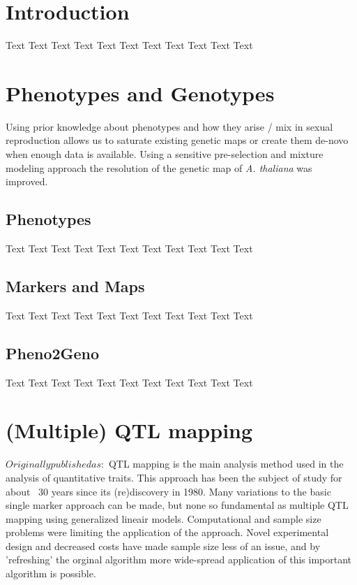 \documentclass[11pt, twoside, a5paper]{report}
\begin{document}
\tableofcontents

\chapter{Introduction}
Text Text Text Text Text Text Text Text Text Text Text

\chapter{Phenotypes and Genotypes}
Using prior knowledge about phenotypes and how they arise / mix in sexual reproduction allows us to saturate 
existing genetic maps or create them de-novo when enough data is available. Using a sensitive pre-selection 
and mixture modeling approach the resolution of the genetic map of \emph{A. thaliana} was improved.

\section{Phenotypes}
Text Text Text Text Text Text Text Text Text Text Text

\section{Markers and Maps}
Text Text Text Text Text Text Text Text Text Text Text

\section{Pheno2Geno}
Text Text Text Text Text Text Text Text Text Text Text

\chapter{(Multiple) QTL mapping}
$ Originally published as: $
QTL mapping is the main analysis method used in the analysis of quantitative traits. This approach has been 
the subject of study for about ~30 years since its (re)discovery in 1980. Many variations to the basic single 
marker approach can be made, but none so fundamental as multiple QTL mapping using generalized lineair models. 
Computational and sample size problems were limiting the application of the approach. Novel experimental 
design and decreased costs have made sample size less of an issue, and by 'refreshing' the orginal algorithm 
more wide-spread application of this important algorithm is possible.
\end{document}
